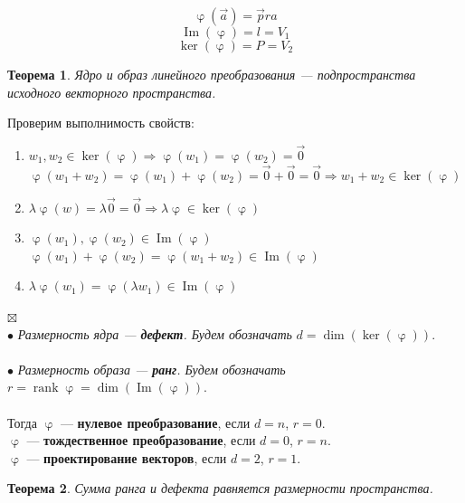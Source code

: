 \documentclass[a4paper, 12pt]{article}
\newtheorem*{theorem}{Теорема}
\newenvironment{Proof}
{\par\noindent{$\blacklozenge$}}
{\hfill$\scriptstyle\boxtimes$}
\newcommand{\rank}{\operatorname{rank}}
\renewcommand{\Im}{\operatorname{Im}}
\renewcommand{\ker}{\operatorname{ker}}
\renewcommand{\varphi}{\upvarphi}
\begin{document}
$$\varphi(\vec a)=\vec pr a$$
$$\Im (\varphi) = l = V_1$$
$$\ker (\varphi) = P = V_2$$
\begin{theorem}
    Ядро и образ линейного преобразования --- подпространства исходного векторного пространства.
\end{theorem}
\begin{Proof}
	Проверим выполнимость свойств:
   \begin{enumerate}
       \item $w_1,w_2 \in \ker (\varphi) \Rightarrow \varphi(w_1)=\varphi(w_2)=\vec 0$
       $\varphi(w_1+w_2)=\varphi(w_1)+\varphi(w_2)=\vec 0+ \vec 0=\vec 0 \Rightarrow w_1+w_2 \in \ker (\varphi)$
       \item $\lambda \varphi(w)=\lambda \vec 0=\vec 0 \Rightarrow \lambda \varphi \in \ker (\varphi)$
       \item $\varphi(w_1),\varphi(w_2) \in \Im (\varphi)$\\
       $\varphi(w_1)+\varphi(w_2)=\varphi(w_1+w_2) \in \Im (\varphi)$
       \item $\lambda \varphi(w_1)=\varphi(\lambda w_1) \in \Im (\varphi)$
   \end{enumerate}
\end{Proof}\\
$\bullet$ \textit{Размерность ядра --- \textbf{дефект}. Будем обозначать} $d = \dim( \ker (\varphi))$.\\\\
$\bullet$ \textit{Размерность образа --- \textbf{ранг}. Будем обозначать} $r = \rank \varphi = \dim  (\Im (\varphi))$.\\\\
Тогда $\varphi$ --- \textbf{нулевое преобразование}, если $d=n$, $r=0$.\\
$\varphi$ --- \textbf{тождественное преобразование}, если $d=0$, $r=n$.\\
$\varphi$ --- \textbf{проектирование векторов}, если $d=2$, $r=1$.
\begin{theorem}
    Сумма ранга и дефекта равняется размерности пространства.
\end{theorem}
\end{document}
